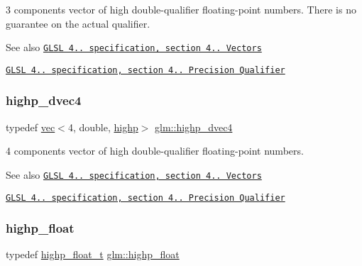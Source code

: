 3 components vector of high double-\/qualifier floating-\/point numbers. There is no guarantee on the actual qualifier.

\begin{DoxySeeAlso}{See also}
\href{http://www.opengl.org/registry/doc/GLSLangSpec.4.20.8.pdf}{\tt G\+L\+SL 4.. specification, section 4.. Vectors} 

\href{http://www.opengl.org/registry/doc/GLSLangSpec.4.20.8.pdf}{\tt G\+L\+SL 4.. specification, section 4.. Precision Qualifier} 
\end{DoxySeeAlso}
\mbox{\label{group__core__precision_ga6e8645fa38f0260e57f1fb7555de0c2f}} 
\subsubsection{\texorpdfstring{highp\+\_\+dvec4}{highp\_dvec4}}
{\footnotesize\ttfamily typedef \mbox{\hyperlink{structglm_1_1vec}{vec}}$<$4, double, \mbox{\hyperlink{namespaceglm_a36ed105b07c7746804d7fdc7cc90ff25ac6f7eab42eacbb10d59a58e95e362074}{highp}}$>$ \mbox{\hyperlink{group__core__precision_ga6e8645fa38f0260e57f1fb7555de0c2f}{glm\+::highp\+\_\+dvec4}}}

4 components vector of high double-\/qualifier floating-\/point numbers.

\begin{DoxySeeAlso}{See also}
\href{http://www.opengl.org/registry/doc/GLSLangSpec.4.20.8.pdf}{\tt G\+L\+SL 4.. specification, section 4.. Vectors} 

\href{http://www.opengl.org/registry/doc/GLSLangSpec.4.20.8.pdf}{\tt G\+L\+SL 4.. specification, section 4.. Precision Qualifier} 
\end{DoxySeeAlso}
\mbox{\label{group__core__precision_ga3d443a093adc053638ed7f81c5bfe300}} 
\subsubsection{\texorpdfstring{highp\+\_\+float}{highp\_float}}
{\footnotesize\ttfamily typedef \mbox{\hyperlink{namespaceglm_af6f4e45ae06ae3f979dd30cafe7d07c6}{highp\+\_\+float\+\_\+t}} \mbox{\hyperlink{group__core__precision_ga3d443a093adc053638ed7f81c5bfe300}{glm\+::highp\+\_\+float}}}

